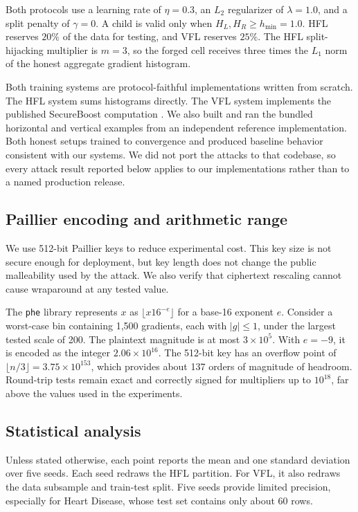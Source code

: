 \documentclass[11pt]{article}
\begin{document}
Both protocols use a learning rate of $\eta=0.3$, an $L_2$ regularizer of $\lambda=1.0$, and a split penalty of $\gamma=0$. A child is valid only when $H_L,H_R\geq h_{\min}=1.0$. HFL reserves $20\%$ of the data for testing, and VFL reserves $25\%$. The HFL split-hijacking multiplier is $m=3$, so the forged cell receives three times the $L_1$ norm of the honest aggregate gradient histogram.

Both training systems are protocol-faithful implementations written from scratch. The HFL system sums histograms directly. The VFL system implements the published SecureBoost computation \cite{cheng2021secureboost}. We also built and ran the bundled horizontal and vertical examples from an independent reference implementation. Both honest setups trained to convergence and produced baseline behavior consistent with our systems. We did not port the attacks to that codebase, so every attack result reported below applies to our implementations rather than to a named production release.

\subsection{Paillier encoding and arithmetic range}

We use 512-bit Paillier keys to reduce experimental cost. This key size is not secure enough for deployment, but key length does not change the public malleability used by the attack. We also verify that ciphertext rescaling cannot cause wraparound at any tested value.

The \texttt{phe} library represents $x$ as $\lfloor x16^{-e}\rfloor$ for a base-16 exponent $e$. Consider a worst-case bin containing 1,500 gradients, each with $\lvert g\rvert\leq1$, under the largest tested scale of 200. The plaintext magnitude is at most $3\times10^5$. With $e=-9$, it is encoded as the integer $2.06\times10^{16}$. The 512-bit key has an overflow point of $\lfloor n/3\rfloor=3.75\times10^{153}$, which provides about 137 orders of magnitude of headroom. Round-trip tests remain exact and correctly signed for multipliers up to $10^{18}$, far above the values used in the experiments.

\subsection{Statistical analysis}
\label{sec:statmethod}

Unless stated otherwise, each point reports the mean and one standard deviation over five seeds. Each seed redraws the HFL partition. For VFL, it also redraws the data subsample and train-test split. Five seeds provide limited precision, especially for Heart Disease, whose test set contains only about 60 rows.
\end{document}
